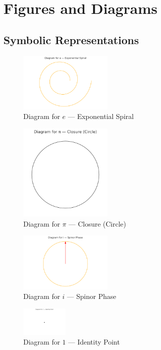 
\section{Figures and Diagrams}

\subsection{Symbolic Representations}

\begin{figure}[h!]
  \centering
  \includegraphics[width=0.4\textwidth]{hs_diagram_e.png}
  \caption{Diagram for $e$ — Exponential Spiral}
\end{figure}

\begin{figure}[h!]
  \centering
  \includegraphics[width=0.4\textwidth]{hs_diagram_pi.png}
  \caption{Diagram for $\pi$ — Closure (Circle)}
\end{figure}

\begin{figure}[h!]
  \centering
  \includegraphics[width=0.4\textwidth]{hs_diagram_i.png}
  \caption{Diagram for $i$ — Spinor Phase}
\end{figure}

\begin{figure}[h!]
  \centering
  \includegraphics[width=0.2\textwidth]{hs_diagram_1.png}
  \caption{Diagram for $1$ — Identity Point}
\end{figure}

